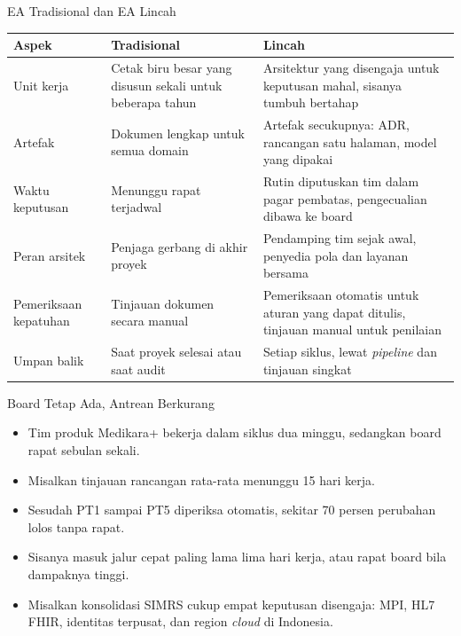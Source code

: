 \documentclass[aspectratio=169, table, 12pt]{beamer}
\begin{document}
\begin{frame}{{\Large EA Tradisional dan EA Lincah}}
  \scriptsize
  \begin{tabularx}{\textwidth}{L{2.4cm}YY}
    \hline
    \textbf{Aspek} & \textbf{Tradisional} & \textbf{Lincah} \\
    \hline
    Unit kerja & Cetak biru besar yang disusun sekali untuk beberapa tahun &
      Arsitektur yang disengaja untuk keputusan mahal, sisanya tumbuh bertahap \\
    \hline
    Artefak & Dokumen lengkap untuk semua domain & Artefak secukupnya: ADR,
      rancangan satu halaman, model yang dipakai \\
    \hline
    Waktu keputusan & Menunggu rapat terjadwal & Rutin diputuskan tim dalam
      pagar pembatas, pengecualian dibawa ke board \\
    \hline
    Peran arsitek & Penjaga gerbang di akhir proyek & Pendamping tim sejak
      awal, penyedia pola dan layanan bersama \\
    \hline
    Pemeriksaan kepatuhan & Tinjauan dokumen secara manual & Pemeriksaan
      otomatis untuk aturan yang dapat ditulis, tinjauan manual untuk penilaian \\
    \hline
    Umpan balik & Saat proyek selesai atau saat audit & Setiap siklus,
      lewat \textit{pipeline} dan tinjauan singkat \\
    \hline
  \end{tabularx}
\end{frame}

\begin{frame}{{\Large Board Tetap Ada, Antrean Berkurang}}
  \small
  \vspace{4pt}
  \begin{itemize}
    \item Tim produk Medikara+ bekerja dalam siklus dua minggu, sedangkan board rapat sebulan sekali.
    \item Misalkan tinjauan rancangan rata-rata menunggu 15 hari kerja.
    \item Sesudah PT1 sampai PT5 diperiksa otomatis, sekitar 70 persen perubahan lolos tanpa rapat.
    \item Sisanya masuk jalur cepat paling lama lima hari kerja, atau rapat board bila dampaknya tinggi.
    \item Misalkan konsolidasi SIMRS cukup empat keputusan disengaja: MPI, HL7 FHIR, identitas terpusat,
          dan region \textit{cloud} di Indonesia.
  \end{itemize}
\end{frame}
\end{document}
